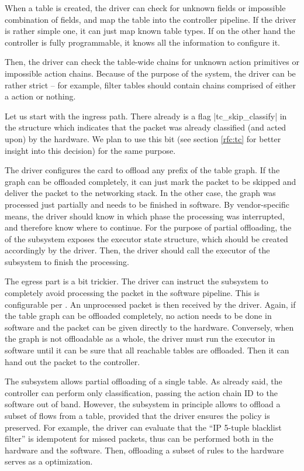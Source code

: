 When a table is created, the driver can check for unknown fields or impossible
combination of fields, and map the table into the controller pipeline. If the
driver is rather simple one, it can just map known table types. If on the other
hand the controller is fully programmable, it knows all the information to
configure it.

Then, the driver can check the table-wide chains for unknown action primitives or
impossible action chains. Because of the purpose of the system, the driver can
be rather strict -- for example, filter tables should contain chains comprised
of either a  action or nothing.

Let us start with the ingress path. There already is a flag
\field|tc_skip_classify| in the \skb{} structure which indicates that
the packet was already classified (and acted upon) by the hardware. We plan to
use this bit (see section \ref{rfc:tc} for better insight into this decision)
for the same purpose.

The driver configures the card to offload any prefix of the table graph. If the
graph can be offloaded completely, it can just mark the packet to be skipped
and deliver the packet to the networking stack. In the other case,
the graph was processed just partially and needs to be finished in software. By
vendor-specific means, the driver should know in which phase the processing was
interrupted, and therefore know where to continue. For the purpose of partial
offloading, the  of the subsystem exposes the executor state
structure, which should be created accordingly by the driver. Then, the driver
should call the executor of the subsystem to finish the processing.

The egress part is a bit trickier. The driver can instruct the subsystem to
completely avoid processing the packet in the software pipeline. This is
configurable per \netdev. An unprocessed packet is then received by the
driver. Again, if the table graph can be offloaded completely, no action needs
to be done in software and the packet can be given directly to the hardware.
Conversely, when the graph is not offloadable as a whole, the driver must
run the executor in software until it can be sure that all reachable tables are
offloaded. Then it can hand out the packet to the controller.

The subsystem allows partial offloading of a single table. As already said, the
controller can perform only classification, passing the action chain ID to the
software out of band. However, the subsystem in principle allows to offload
a subset of flows from a table, provided that the driver ensures the policy is
preserved. For example, the driver can evaluate that the ``IP 5-tuple blacklist
filter'' is idempotent for missed packets, thus can be performed both in the
hardware and the software. Then, offloading a subset of rules to the hardware
serves as a optimization.

